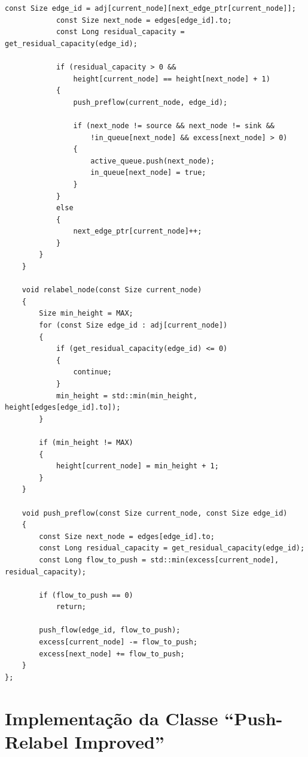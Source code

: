 \documentclass[12pt,a4paper]{article}
\begin{document}
\begin{lstlisting}[caption={Implementação em C++ da classe \lstinline{PushRelabel}, baseada em pré-fluxos topológicos e política de processamento em fila (FIFO).}, label={lst:push_relabel}]
			const Size edge_id = adj[current_node][next_edge_ptr[current_node]];
			const Size next_node = edges[edge_id].to;
			const Long residual_capacity = get_residual_capacity(edge_id);

			if (residual_capacity > 0 &&
			    height[current_node] == height[next_node] + 1)
			{
				push_preflow(current_node, edge_id);

				if (next_node != source && next_node != sink &&
				    !in_queue[next_node] && excess[next_node] > 0)
				{
					active_queue.push(next_node);
					in_queue[next_node] = true;
				}
			}
			else
			{
				next_edge_ptr[current_node]++;
			}
		}
	}

	void relabel_node(const Size current_node)
	{
		Size min_height = MAX;
		for (const Size edge_id : adj[current_node])
		{
			if (get_residual_capacity(edge_id) <= 0)
			{
				continue;
			}
			min_height = std::min(min_height, height[edges[edge_id].to]);
		}

		if (min_height != MAX)
		{
			height[current_node] = min_height + 1;
		}
	}

	void push_preflow(const Size current_node, const Size edge_id)
	{
		const Size next_node = edges[edge_id].to;
		const Long residual_capacity = get_residual_capacity(edge_id);
		const Long flow_to_push = std::min(excess[current_node], residual_capacity);

		if (flow_to_push == 0)
			return;

		push_flow(edge_id, flow_to_push);
		excess[current_node] -= flow_to_push;
		excess[next_node] += flow_to_push;
	}
};
\end{lstlisting}

\newpage
\section{Implementação da Classe ``Push-Relabel Improved''}
\label{ap:push_relabel_improved}
\end{document}
